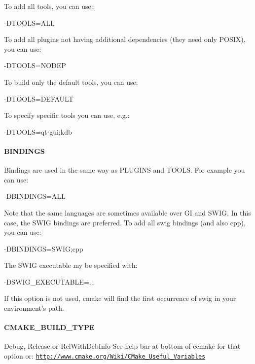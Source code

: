 To add all tools, you can use\+:\+: \begin{DoxyVerb}    -DTOOLS=ALL
\end{DoxyVerb}


To add all plugins not having additional dependencies (they need only P\+O\+S\+I\+X), you can use\+: \begin{DoxyVerb}    -DTOOLS=NODEP
\end{DoxyVerb}


To build only the default tools, you can use\+: \begin{DoxyVerb}    -DTOOLS=DEFAULT
\end{DoxyVerb}


To specify specific tools you can use, e.\+g.\+: \begin{DoxyVerb}    -DTOOLS=qt-gui;kdb
\end{DoxyVerb}


\paragraph*{B\+I\+N\+D\+I\+N\+G\+S}

Bindings are used in the same way as P\+L\+U\+G\+I\+N\+S and T\+O\+O\+L\+S. For example you can use\+: \begin{DoxyVerb}    -DBINDINGS=ALL
\end{DoxyVerb}


Note that the same languages are sometimes available over G\+I and S\+W\+I\+G. In this case, the S\+W\+I\+G bindings are preferred. To add all swig bindings (and also cpp), you can use\+: \begin{DoxyVerb}    -DBINDINGS=SWIG;cpp
\end{DoxyVerb}


The S\+W\+I\+G executable my be specified with\+: \begin{DoxyVerb}    -DSWIG_EXECUTABLE=...
\end{DoxyVerb}


If this option is not used, cmake will find the first occurrence of {\ttfamily swig} in your environment's path.

\paragraph*{C\+M\+A\+K\+E\+\_\+\+B\+U\+I\+L\+D\+\_\+\+T\+Y\+P\+E}

Debug, Release or Rel\+With\+Deb\+Info See help bar at bottom of ccmake for that option or\+: \href{http://www.cmake.org/Wiki/CMake_Useful_Variables}{\tt http\+://www.\+cmake.\+org/\+Wiki/\+C\+Make\+\_\+\+Useful\+\_\+\+Variables}

